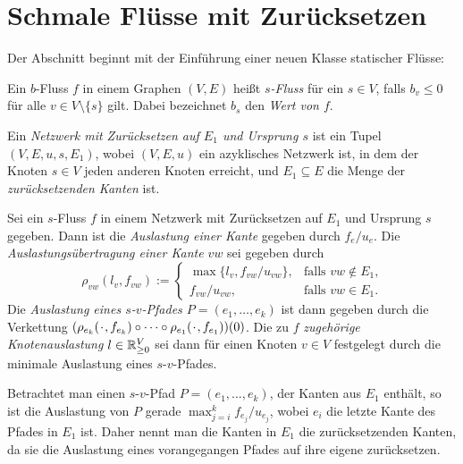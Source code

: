 \section{Schmale Flüsse mit Zurücksetzen}\label{sec-thin-flows}
\newcommand*{\PlH}{\makebox[1ex]{\textbf{$\cdot$}}}

Der Abschnitt beginnt mit der Einführung einer neuen Klasse statischer Flüsse:

\begin{definition}[$s$-Fluss]
	Ein $b$-Fluss $f$ in einem Graphen $(V, E)$ heißt \emph{$s$-Fluss} für ein $s\in V$, falls $b_v\leq 0$ für alle $v\in V\setminus \{ s \}$ gilt.
	Dabei bezeichnet $b_s$ den \emph{Wert von $f$}. 
\end{definition}

\begin{definition}
	Ein \emph{Netzwerk mit Zurücksetzen auf $E_1$ und Ursprung $s$} ist ein Tupel $(V, E, u, s, E_1)$, wobei $(V, E, u)$ ein azyklisches Netzwerk ist, in dem der Knoten $s\in V$ jeden anderen Knoten erreicht, und $E_1\subseteq E$ die Menge der \emph{zurücksetzenden Kanten} ist.
\end{definition}

\begin{definition}[Auslastung]
	Sei ein $s$-Fluss $f$ in einem Netzwerk mit Zurücksetzen auf $E_1$ und Ursprung $s$ gegeben.
	Dann ist die \emph{Auslastung einer Kante} gegeben durch $f_e/u_e$.
	Die \emph{Auslastungsübertragung einer Kante $vw$} sei gegeben durch \[ \rho_{vw}(l_v, f_{vw}) := \begin{cases}
		\max\{ l_v, f_{vw} / u_{vw} \}, & \text{falls $vw\notin E_1$,}\\
		f_{vw} / u_{vw}, & \text{falls $vw\in E_1$.}
	\end{cases}
	\]
	Die \emph{Auslastung eines $s$-$v$-Pfades $P=(e_1,\dots,e_k)$} ist dann gegeben durch die Verkettung $(\rho_{e_k}(\PlH, f_{e_k})\circ \dots \circ \rho_{e_1}(\PlH, f_{e_1}))(0)$.
	Die zu $f$ \emph{zugehörige Knotenauslastung $l\in\mathbb{R}_{\geq 0}^V$} sei dann für einen Knoten $v\in V$ festgelegt durch die minimale Auslastung eines $s$-$v$-Pfades.
\end{definition}

Betrachtet man einen $s$-$v$-Pfad $P=(e_1, \dots, e_k)$, der Kanten aus $E_1$ enthält, so ist die Auslastung von $P$ gerade $\max_{j=i}^k f_{e_j}/u_{e_j}$, wobei $e_i$ die letzte Kante des Pfades in $E_1$ ist.
Daher nennt man die Kanten in $E_1$ die zurücksetzenden Kanten, da sie die Auslastung eines vorangegangen Pfades auf ihre eigene zurücksetzen.


